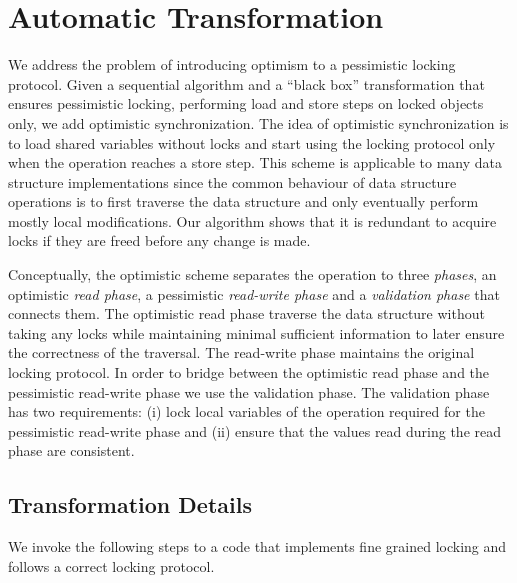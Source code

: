 \section{Automatic Transformation}\label{sec:algorithm}
We address the problem of introducing 
optimism to a pessimistic locking protocol. 
Given a sequential algorithm and a ``black box'' transformation
that ensures pessimistic locking, performing load and store steps on
locked objects only, we add optimistic synchronization.
The idea of optimistic synchronization is to load 
shared variables without locks and start using the 
locking protocol only when the operation reaches a store step.
This scheme is applicable to many data structure implementations
since the common behaviour of data structure operations 
is to first traverse the data structure and only eventually 
perform mostly local modifications.
Our algorithm shows that it is redundant to 
acquire locks if they are freed before any change is made.    

Conceptually, the optimistic scheme separates the operation to three
\emph{phases}, an optimistic \emph{read phase},
a pessimistic \emph{read-write phase} and a 
\emph{validation phase} that connects them. 
The optimistic read phase traverse the data structure without
taking any locks while maintaining minimal sufficient 
information to later ensure the correctness of the traversal.
The read-write phase maintains the original locking protocol. 
In order to bridge between the optimistic read phase and the  
pessimistic read-write phase we use the validation phase. 
The validation phase has two requirements: 
(i) lock local variables of the operation required for the 
pessimistic read-write phase and 
(ii) ensure that the values read during the read 
phase are consistent.  
  
\subsection{Transformation Details}
We invoke the following steps to a code that implements 
fine grained locking and follows a correct locking
protocol.  

